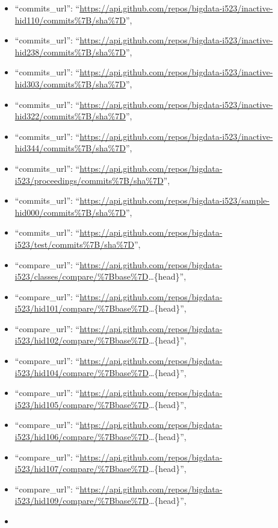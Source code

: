 \begin{itemize}
\item
  ``commits\_url'':
  ``\url{https://api.github.com/repos/bigdata-i523/inactive-hid110/commits\%7B/sha\%7D}'',
\item
  ``commits\_url'':
  ``\url{https://api.github.com/repos/bigdata-i523/inactive-hid238/commits\%7B/sha\%7D}'',
\item
  ``commits\_url'':
  ``\url{https://api.github.com/repos/bigdata-i523/inactive-hid303/commits\%7B/sha\%7D}'',
\item
  ``commits\_url'':
  ``\url{https://api.github.com/repos/bigdata-i523/inactive-hid322/commits\%7B/sha\%7D}'',
\item
  ``commits\_url'':
  ``\url{https://api.github.com/repos/bigdata-i523/inactive-hid344/commits\%7B/sha\%7D}'',
\item
  ``commits\_url'':
  ``\url{https://api.github.com/repos/bigdata-i523/proceedings/commits\%7B/sha\%7D}'',
\item
  ``commits\_url'':
  ``\url{https://api.github.com/repos/bigdata-i523/sample-hid000/commits\%7B/sha\%7D}'',
\item
  ``commits\_url'':
  ``\url{https://api.github.com/repos/bigdata-i523/test/commits\%7B/sha\%7D}'',
\item
  ``compare\_url'':
  ``\url{https://api.github.com/repos/bigdata-i523/classes/compare/\%7Bbase\%7D}\ldots{}\{head\}'',
\item
  ``compare\_url'':
  ``\url{https://api.github.com/repos/bigdata-i523/hid101/compare/\%7Bbase\%7D}\ldots{}\{head\}'',
\item
  ``compare\_url'':
  ``\url{https://api.github.com/repos/bigdata-i523/hid102/compare/\%7Bbase\%7D}\ldots{}\{head\}'',
\item
  ``compare\_url'':
  ``\url{https://api.github.com/repos/bigdata-i523/hid104/compare/\%7Bbase\%7D}\ldots{}\{head\}'',
\item
  ``compare\_url'':
  ``\url{https://api.github.com/repos/bigdata-i523/hid105/compare/\%7Bbase\%7D}\ldots{}\{head\}'',
\item
  ``compare\_url'':
  ``\url{https://api.github.com/repos/bigdata-i523/hid106/compare/\%7Bbase\%7D}\ldots{}\{head\}'',
\item
  ``compare\_url'':
  ``\url{https://api.github.com/repos/bigdata-i523/hid107/compare/\%7Bbase\%7D}\ldots{}\{head\}'',
\item
  ``compare\_url'':
  ``\url{https://api.github.com/repos/bigdata-i523/hid109/compare/\%7Bbase\%7D}\ldots{}\{head\}'',
\item

\end{itemize}
